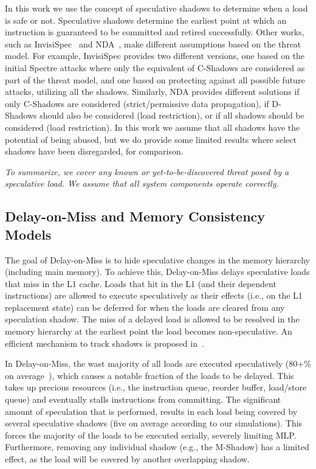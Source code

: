 In this work we use the concept of speculative shadows to determine when a load is safe or not. Speculative shadows determine the earliest point at which an instruction is guaranteed to be committed and retired successfully. Other works, such as InvisiSpec~\cite{yan_invisispec:MICRO2018} and NDA~\cite{weisse2019nda}, make different assumptions based on the threat model. For example, InvisiSpec provides two different versions, one based on the initial Spectre attacks where only the equivalent of C-Shadows are considered as part of the threat model, and one based on protecting against all possible future attacks, utilizing all the shadows. Similarly, NDA provides different solutions if only C-Shadows are considered (strict/permissive data propagation), if D-Shadows should also be considered (load restriction), or if all shadows should be considered (load restriction). In this work we assume that all shadows have the potential of being abused, but we do provide some limited results where select shadows have been disregarded, for comparison.

{\em To summarize, 
we cover any known or yet-to-be-discovered threat posed by a speculative load. We assume that all system components operate correctly.}

\subsection{Delay-on-Miss and Memory Consistency Models}
\label{sec:dom-vp}
The goal of Delay-on-Miss is to hide speculative changes in the memory hierarchy (including main memory). 
To achieve this, Delay-on-Miss delays speculative loads that miss in the L1 cache. Loads that hit in the L1 (and their dependent instructions) are allowed to execute speculatively as their effects (i.e., on the L1 replacement state) can be deferred for when the loads are cleared from any speculation shadow. 
The miss of a delayed load is allowed to be resolved in the memory hierarchy at the earliest point the load becomes non-speculative. An efficient mechanism to track shadows is proposed in~\cite{sakalis+:ISCA2019vp}. 

In Delay-on-Miss, the wast majority of all loads are executed speculatively (80+\% on average~\cite{sakalis+:ISCA2019vp}), which causes a notable fraction of the loads to be delayed. This takes up precious resources (i.e., the instruction queue, reorder buffer, load/store queue) and eventually stalls instructions from committing. 
The significant amount of speculation that is performed, results in each load being covered by several speculative shadows (five on average according to our simulations). This forces the majority of the loads to be executed serially, severely limiting MLP. Furthermore, removing any individual shadow (e.g., the M-Shadow) has a limited effect, as the load will be covered by another overlapping shadow.

